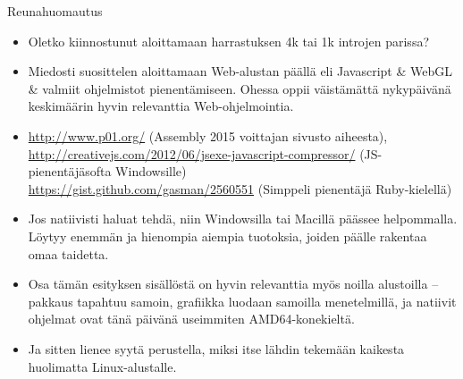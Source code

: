 \documentclass[pdf,10pt]{beamer}
\begin{document}
\begin{frame}{Reunahuomautus}
  \begin{itemize}
    \item Oletko kiinnostunut aloittamaan harrastuksen 4k tai 1k
      introjen parissa?
    \item Miedosti suosittelen aloittamaan Web-alustan päällä eli
      Javascript \& WebGL \& valmiit ohjelmistot
      pienentämiseen. Ohessa oppii väistämättä nykypäivänä keskimäärin
      hyvin relevanttia Web-ohjelmointia.
    \item[]
      {\tiny  \url{http://www.p01.org/} (Assembly 2015 voittajan sivusto aiheesta),\\
      \url{http://creativejs.com/2012/06/jsexe-javascript-compressor/}
      (JS-pienentäjäsofta Windowsille)\\
      \url{https://gist.github.com/gasman/2560551} (Simppeli pienentäjä
      Ruby-kielellä)\\
      }
      
    \item Jos natiivisti haluat tehdä, niin Windowsilla tai Macillä
      päässee helpommalla. Löytyy enemmän ja hienompia aiempia
      tuotoksia, joiden päälle rakentaa omaa taidetta.
    \item Osa tämän esityksen sisällöstä on hyvin relevanttia myös
      noilla alustoilla -- pakkaus tapahtuu samoin, grafiikka luodaan
      samoilla menetelmillä, ja natiivit ohjelmat ovat tänä päivänä
      useimmiten AMD64-konekieltä.
    \item Ja sitten lienee syytä perustella, miksi itse lähdin
      tekemään kaikesta huolimatta Linux-alustalle.
  \end{itemize}
\end{frame}
\end{document}
